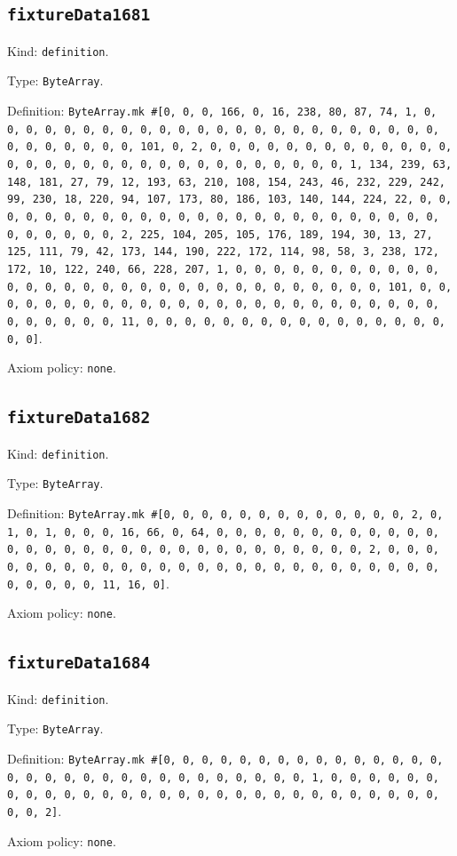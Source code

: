 \documentclass[11pt]{article}
\begin{document}
\subsection*{\texttt{fixtureData1681}}
\noindent Kind: \texttt{definition}.\par
\noindent Type: \texttt{ByteArray}.\par
\noindent Definition: \texttt{ByteArray.mk \#[0, 0, 0, 166, 0, 16, 238, 80, 87, 74, 1, 0, 0, 0, 0, 0, 0, 0, 0, 0, 0, 0, 0, 0, 0, 0, 0, 0, 0, 0, 0, 0, 0, 0, 0, 0, 0, 0, 0, 0, 0, 0, 101, 0, 2, 0, 0, 0, 0, 0, 0, 0, 0, 0, 0, 0, 0, 0, 0, 0, 0, 0, 0, 0, 0, 0, 0, 0, 0, 0, 0, 0, 0, 0, 0, 0, 1, 134, 239, 63, 148, 181, 27, 79, 12, 193, 63, 210, 108, 154, 243, 46, 232, 229, 242, 99, 230, 18, 220, 94, 107, 173, 80, 186, 103, 140, 144, 224, 22, 0, 0, 0, 0, 0, 0, 0, 0, 0, 0, 0, 0, 0, 0, 0, 0, 0, 0, 0, 0, 0, 0, 0, 0, 0, 0, 0, 0, 0, 0, 0, 2, 225, 104, 205, 105, 176, 189, 194, 30, 13, 27, 125, 111, 79, 42, 173, 144, 190, 222, 172, 114, 98, 58, 3, 238, 172, 172, 10, 122, 240, 66, 228, 207, 1, 0, 0, 0, 0, 0, 0, 0, 0, 0, 0, 0, 0, 0, 0, 0, 0, 0, 0, 0, 0, 0, 0, 0, 0, 0, 0, 0, 0, 0, 0, 0, 101, 0, 0, 0, 0, 0, 0, 0, 0, 0, 0, 0, 0, 0, 0, 0, 0, 0, 0, 0, 0, 0, 0, 0, 0, 0, 0, 0, 0, 0, 0, 0, 11, 0, 0, 0, 0, 0, 0, 0, 0, 0, 0, 0, 0, 0, 0, 0, 0, 0, 0]}.\par
\noindent Axiom policy: \texttt{none}.\par
\subsection*{\texttt{fixtureData1682}}
\noindent Kind: \texttt{definition}.\par
\noindent Type: \texttt{ByteArray}.\par
\noindent Definition: \texttt{ByteArray.mk \#[0, 0, 0, 0, 0, 0, 0, 0, 0, 0, 0, 0, 0, 2, 0, 1, 0, 1, 0, 0, 0, 16, 66, 0, 64, 0, 0, 0, 0, 0, 0, 0, 0, 0, 0, 0, 0, 0, 0, 0, 0, 0, 0, 0, 0, 0, 0, 0, 0, 0, 0, 0, 0, 0, 0, 0, 2, 0, 0, 0, 0, 0, 0, 0, 0, 0, 0, 0, 0, 0, 0, 0, 0, 0, 0, 0, 0, 0, 0, 0, 0, 0, 0, 0, 0, 0, 0, 0, 11, 16, 0]}.\par
\noindent Axiom policy: \texttt{none}.\par
\subsection*{\texttt{fixtureData1684}}
\noindent Kind: \texttt{definition}.\par
\noindent Type: \texttt{ByteArray}.\par
\noindent Definition: \texttt{ByteArray.mk \#[0, 0, 0, 0, 0, 0, 0, 0, 0, 0, 0, 0, 0, 0, 0, 0, 0, 0, 0, 0, 0, 0, 0, 0, 0, 0, 0, 0, 0, 0, 0, 1, 0, 0, 0, 0, 0, 0, 0, 0, 0, 0, 0, 0, 0, 0, 0, 0, 0, 0, 0, 0, 0, 0, 0, 0, 0, 0, 0, 0, 0, 0, 0, 2]}.\par
\noindent Axiom policy: \texttt{none}.\par
\end{document}
